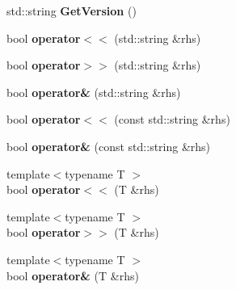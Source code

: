 \begin{DoxyCompactItemize}
\item 
\hypertarget{classBinaryStream_a855fa4cf9563eab19c5ac69b447da912}{std\-::string {\bfseries Get\-Version} ()}\label{classBinaryStream_a855fa4cf9563eab19c5ac69b447da912}

\item 
\hypertarget{classBinaryStream_a43f9922bf139ed387f8fce43ee5f6b63}{bool {\bfseries operator$<$$<$} (std\-::string \&rhs)}\label{classBinaryStream_a43f9922bf139ed387f8fce43ee5f6b63}

\item 
\hypertarget{classBinaryStream_a971f6d7c5938e646717dc9a8207f38ae}{bool {\bfseries operator$>$$>$} (std\-::string \&rhs)}\label{classBinaryStream_a971f6d7c5938e646717dc9a8207f38ae}

\item 
\hypertarget{classBinaryStream_a61181bd9b36486e7f400b81f9938297f}{bool {\bfseries operator\&} (std\-::string \&rhs)}\label{classBinaryStream_a61181bd9b36486e7f400b81f9938297f}

\item 
\hypertarget{classBinaryStream_a5d0d37a2b73f15728916429f8bb2caff}{bool {\bfseries operator$<$$<$} (const std\-::string \&rhs)}\label{classBinaryStream_a5d0d37a2b73f15728916429f8bb2caff}

\item 
\hypertarget{classBinaryStream_aad6800a1258f980a37e8f9e779cd293e}{bool {\bfseries operator\&} (const std\-::string \&rhs)}\label{classBinaryStream_aad6800a1258f980a37e8f9e779cd293e}

\item 
\hypertarget{classBinaryStream_ad0945749b4885fddf66a01903c8cbbfd}{{\footnotesize template$<$typename T $>$ }\\bool {\bfseries operator$<$$<$} (T \&rhs)}\label{classBinaryStream_ad0945749b4885fddf66a01903c8cbbfd}

\item 
\hypertarget{classBinaryStream_a94b63bf291fc3ffb1c7d4f2775d13375}{{\footnotesize template$<$typename T $>$ }\\bool {\bfseries operator$>$$>$} (T \&rhs)}\label{classBinaryStream_a94b63bf291fc3ffb1c7d4f2775d13375}

\item 
\hypertarget{classBinaryStream_aab5b9db04d8f0da5bbf8a26bf347528f}{{\footnotesize template$<$typename T $>$ }\\bool {\bfseries operator\&} (T \&rhs)}\label{classBinaryStream_aab5b9db04d8f0da5bbf8a26bf347528f}


\end{DoxyCompactItemize}
